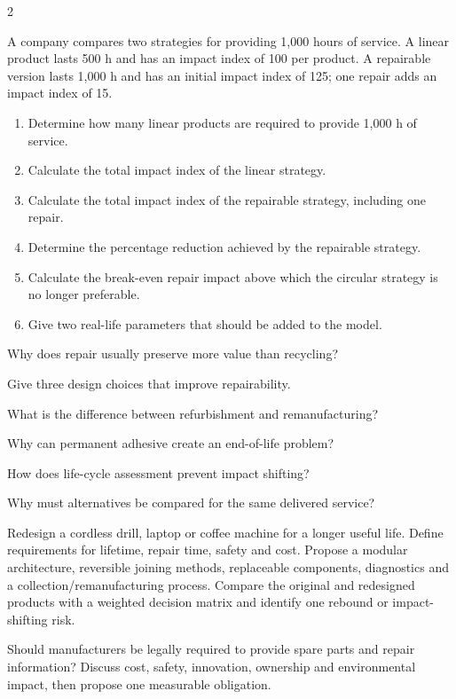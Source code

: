 \begin{multicols}{2}
\begin{applicationexercise}
A company compares two strategies for providing 1,000 hours of service. A linear product lasts 500 h
and has an impact index of 100 per product. A repairable version lasts 1,000 h and has an initial
impact index of 125; one repair adds an impact index of 15.
\begin{enumerate}
\item Determine how many linear products are required to provide 1,000 h of service.
\item Calculate the total impact index of the linear strategy.
\item Calculate the total impact index of the repairable strategy, including one repair.
\item Determine the percentage reduction achieved by the repairable strategy.
\item Calculate the break-even repair impact above which the circular strategy is no longer preferable.
\item Give two real-life parameters that should be added to the model.
\end{enumerate}
\end{applicationexercise}

\begin{questions}
\item Why does repair usually preserve more value than recycling?
\item Give three design choices that improve repairability.
\item What is the difference between refurbishment and remanufacturing?
\item Why can permanent adhesive create an end-of-life problem?
\item How does life-cycle assessment prevent impact shifting?
\item Why must alternatives be compared for the same delivered service?
\end{questions}

\begin{engineeringchallenge}
Redesign a cordless drill, laptop or coffee machine for a longer useful life. Define requirements for
lifetime, repair time, safety and cost. Propose a modular architecture, reversible joining methods,
replaceable components, diagnostics and a collection/remanufacturing process. Compare the original and
redesigned products with a weighted decision matrix and identify one rebound or impact-shifting risk.
\end{engineeringchallenge}

\begin{speaking}
Should manufacturers be legally required to provide spare parts and repair information? Discuss cost,
safety, innovation, ownership and environmental impact, then propose one measurable obligation.
\end{speaking}
\end{multicols}

